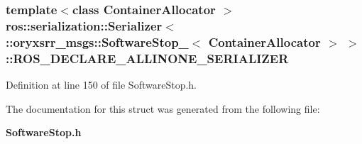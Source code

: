 \subsubsection[{\-R\-O\-S\-\_\-\-D\-E\-C\-L\-A\-R\-E\-\_\-\-A\-L\-L\-I\-N\-O\-N\-E\-\_\-\-S\-E\-R\-I\-A\-L\-I\-Z\-E\-R}]{\setlength{\rightskip}{0pt plus 5cm}template$<$class Container\-Allocator $>$ ros\-::serialization\-::\-Serializer$<$ \-::{\bf oryxsrr\-\_\-msgs\-::\-Software\-Stop\-\_\-}$<$ \-Container\-Allocator $>$ $>$\-::{\bf \-R\-O\-S\-\_\-\-D\-E\-C\-L\-A\-R\-E\-\_\-\-A\-L\-L\-I\-N\-O\-N\-E\-\_\-\-S\-E\-R\-I\-A\-L\-I\-Z\-E\-R}}\label{structros_1_1serialization_1_1Serializer_3_01_1_1oryxsrr__msgs_1_1SoftwareStop___3_01ContainerAllocator_01_4_01_4_a0c84dacfc4ec23106174745184dcb608}


\-Definition at line 150 of file \-Software\-Stop.\-h.



\-The documentation for this struct was generated from the following file\-:\begin{DoxyCompactItemize}
\item 
{\bf \-Software\-Stop.\-h}\end{DoxyCompactItemize}
